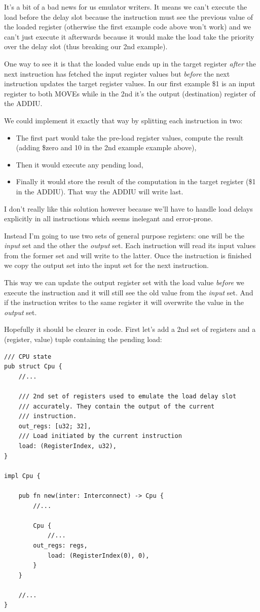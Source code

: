 \documentclass[a4paper]{article}
\begin{document}
It's a bit of a bad news for us emulator writers. It means we can't
execute the load before the delay slot because the instruction must
see the previous value of the loaded register (otherwise the first
example code above won't work) and we can't just execute it afterwards
because it would make the load take the priority over the delay slot
(thus breaking our 2nd example).

One way to see it is that the loaded value ends up in the target
register \emph{after} the next instruction has fetched the input
register values but \emph{before} the next instruction updates the
target register values. In our first example \$1 is an input register
to both MOVEs while in the 2nd it's the output (destination) register
of the ADDIU.

We could implement it exactly that way by splitting each instruction
in two:
\begin{itemize}
\item The first part would take the pre-load register values, compute
  the result (adding \$zero and 10 in the 2nd example example above),
\item Then it would execute any pending load,
\item Finally it would store the result of the computation in the
  target register (\$1 in the ADDIU). That way the ADDIU will write
  last.
\end{itemize}

I don't really like this solution however because we'll have to handle
load delays explicitly in all instructions which seems inelegant and
error-prone.

Instead I'm going to use two sets of general purpose registers: one
will be the \emph{input} set and the other the \emph{output} set. Each
instruction will read its input values from the former set and will
write to the latter. Once the instruction is finished we copy the
output set into the input set for the next instruction.

This way we can update the output register set with the load value
\emph{before} we execute the instruction and it will still see the old
value from the \emph{input} set. And if the instruction writes to the
same register it will overwrite the value in the \emph{output} set.

Hopefully it should be clearer in code. First let's add a 2nd set of
registers and a (register, value) tuple containing the pending load:

\begin{lstlisting}
/// CPU state
pub struct Cpu {
    //...

    /// 2nd set of registers used to emulate the load delay slot
    /// accurately. They contain the output of the current
    /// instruction.
    out_regs: [u32; 32],
    /// Load initiated by the current instruction
    load: (RegisterIndex, u32),
}

impl Cpu {

    pub fn new(inter: Interconnect) -> Cpu {
        //...

        Cpu {
            //...
	    out_regs: regs,
            load: (RegisterIndex(0), 0),
        }
    }

    //...
}
\end{lstlisting}
\end{document}
